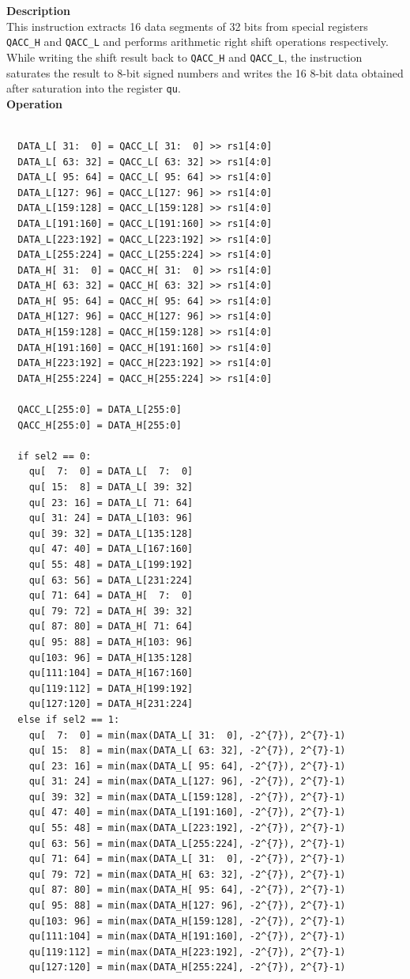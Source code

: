 \textbf{Description}\\
This instruction extracts 16 data segments of 32 bits from special registers \lstinline{QACC_H} and \lstinline{QACC_L} and performs arithmetic right shift operations respectively. While writing the shift result back to \lstinline{QACC_H} and \lstinline{QACC_L}, the instruction saturates the result to 8-bit signed numbers and writes the 16 8-bit data obtained after saturation into the register \lstinline{qu}.\\
\textbf{Operation}
\begin{lstlisting}

  DATA_L[ 31:  0] = QACC_L[ 31:  0] >> rs1[4:0]
  DATA_L[ 63: 32] = QACC_L[ 63: 32] >> rs1[4:0]
  DATA_L[ 95: 64] = QACC_L[ 95: 64] >> rs1[4:0]
  DATA_L[127: 96] = QACC_L[127: 96] >> rs1[4:0]
  DATA_L[159:128] = QACC_L[159:128] >> rs1[4:0]
  DATA_L[191:160] = QACC_L[191:160] >> rs1[4:0]
  DATA_L[223:192] = QACC_L[223:192] >> rs1[4:0]
  DATA_L[255:224] = QACC_L[255:224] >> rs1[4:0]
  DATA_H[ 31:  0] = QACC_H[ 31:  0] >> rs1[4:0]
  DATA_H[ 63: 32] = QACC_H[ 63: 32] >> rs1[4:0]
  DATA_H[ 95: 64] = QACC_H[ 95: 64] >> rs1[4:0]
  DATA_H[127: 96] = QACC_H[127: 96] >> rs1[4:0]
  DATA_H[159:128] = QACC_H[159:128] >> rs1[4:0]
  DATA_H[191:160] = QACC_H[191:160] >> rs1[4:0]
  DATA_H[223:192] = QACC_H[223:192] >> rs1[4:0]
  DATA_H[255:224] = QACC_H[255:224] >> rs1[4:0]

  QACC_L[255:0] = DATA_L[255:0]
  QACC_H[255:0] = DATA_H[255:0]

  if sel2 == 0:
    qu[  7:  0] = DATA_L[  7:  0]
    qu[ 15:  8] = DATA_L[ 39: 32]
    qu[ 23: 16] = DATA_L[ 71: 64]
    qu[ 31: 24] = DATA_L[103: 96]
    qu[ 39: 32] = DATA_L[135:128]
    qu[ 47: 40] = DATA_L[167:160]
    qu[ 55: 48] = DATA_L[199:192]
    qu[ 63: 56] = DATA_L[231:224]
    qu[ 71: 64] = DATA_H[  7:  0]
    qu[ 79: 72] = DATA_H[ 39: 32]
    qu[ 87: 80] = DATA_H[ 71: 64]
    qu[ 95: 88] = DATA_H[103: 96]
    qu[103: 96] = DATA_H[135:128]
    qu[111:104] = DATA_H[167:160]
    qu[119:112] = DATA_H[199:192]
    qu[127:120] = DATA_H[231:224]
  else if sel2 == 1:
    qu[  7:  0] = min(max(DATA_L[ 31:  0], -2^{7}), 2^{7}-1)
    qu[ 15:  8] = min(max(DATA_L[ 63: 32], -2^{7}), 2^{7}-1)
    qu[ 23: 16] = min(max(DATA_L[ 95: 64], -2^{7}), 2^{7}-1)
    qu[ 31: 24] = min(max(DATA_L[127: 96], -2^{7}), 2^{7}-1)
    qu[ 39: 32] = min(max(DATA_L[159:128], -2^{7}), 2^{7}-1)
    qu[ 47: 40] = min(max(DATA_L[191:160], -2^{7}), 2^{7}-1)
    qu[ 55: 48] = min(max(DATA_L[223:192], -2^{7}), 2^{7}-1)
    qu[ 63: 56] = min(max(DATA_L[255:224], -2^{7}), 2^{7}-1)
    qu[ 71: 64] = min(max(DATA_L[ 31:  0], -2^{7}), 2^{7}-1)
    qu[ 79: 72] = min(max(DATA_H[ 63: 32], -2^{7}), 2^{7}-1)
    qu[ 87: 80] = min(max(DATA_H[ 95: 64], -2^{7}), 2^{7}-1)
    qu[ 95: 88] = min(max(DATA_H[127: 96], -2^{7}), 2^{7}-1)
    qu[103: 96] = min(max(DATA_H[159:128], -2^{7}), 2^{7}-1)
    qu[111:104] = min(max(DATA_H[191:160], -2^{7}), 2^{7}-1)
    qu[119:112] = min(max(DATA_H[223:192], -2^{7}), 2^{7}-1)
    qu[127:120] = min(max(DATA_H[255:224], -2^{7}), 2^{7}-1)

\end{lstlisting}


